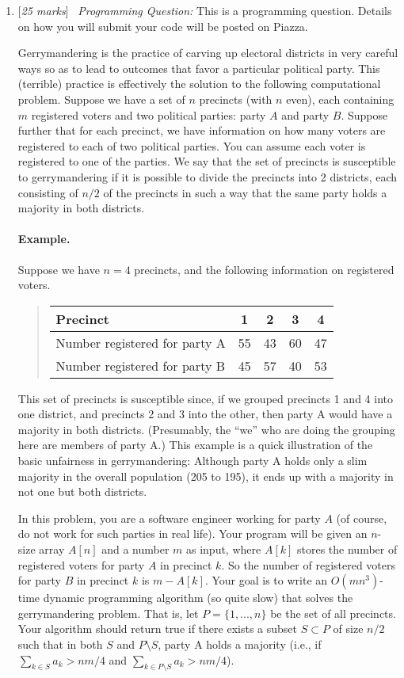 \documentclass[11pt]{article}
\newcommand{\Q}[1]{\medskip\item {[{\em #1 marks\/}]}\ }
\begin{document}
\begin{enumerate}

\Q{25} {\em Programming Question:} This is a programming question. Details on how you will submit your code will be posted on Piazza.

Gerrymandering is the practice of carving up electoral
districts in very careful ways so as to lead to outcomes that favor a particular political party.
This (terrible) practice is effectively the solution to the following computational problem.
Suppose we have a set of $n$ precincts (with $n$ even), each containing $m$ registered voters and two political parties: party $A$ and party $B$. Suppose further that for each precinct, we have information on how many voters are registered to each of two political parties. You can assume each voter is registered to one of the parties.  
We say that the set of precincts is susceptible to gerrymandering if it is possible
to divide the precincts into 2 districts, each consisting of $n/2$ of the precincts in such a way that the same party holds a majority in both districts.

\paragraph{Example.} Suppose we have $n = 4$ precincts, and the following information on registered voters.
\begin{quote}
\begin{tabular}{l|cccc}
Precinct &1& 2& 3& 4\\\hline
Number registered for party A &55 &43 &60 &47\\
Number registered for party B &45 &57 &40 &53
\end{tabular}
\end{quote}
This set of precincts is susceptible since, if we grouped precincts 1 and 4 into one district,
and precincts 2 and 3 into the other, then party A would have a majority in both districts.
(Presumably, the ``we'' who are doing the grouping here are members of party A.) This
example is a quick illustration of the basic unfairness in gerrymandering: Although party A
holds only a slim majority in the overall population (205 to 195), it ends up with a majority
in not one but both districts.

In this problem, you are a software engineer working for party $A$ (of course, do not work for such parties in real life). Your program will be given an $n$-size array $A[n]$ and a number $m$ as input, where $A[k]$ stores the number of registered voters for party $A$ in precinct $k$. So the number of registered voters for party $B$ in precinct $k$ is $m-A[k]$. Your goal is to write an $O(mn^3)$-time dynamic programming algorithm (so quite slow) that solves the gerrymandering problem. That is, let $P=\{1,...,n\}$ be the set of all precincts. Your algorithm should return true if there exists a subset $S\subset P$ of size $n/2$ such that in both $S$ and $P \setminus S$, party A holds a majority (i.e., if $\sum_{k \in S} a_k > nm/4$ and $\sum_{k \in P \setminus S} a_k > nm/4$).


\end{enumerate}
\end{document}
